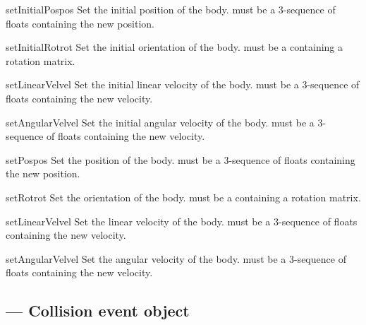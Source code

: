 \begin{methoddesc}{setInitialPos}{pos}
Set the initial position of the body.  must be a 3-sequence of 
floats containing the new position.
\end{methoddesc}

\begin{methoddesc}{setInitialRot}{rot}
Set the initial orientation of the body.  must be a
 containing a rotation matrix.
\end{methoddesc}

\begin{methoddesc}{setLinearVel}{vel}
Set the initial linear velocity of the body.  must be a
3-sequence of floats containing the new velocity.
\end{methoddesc}

\begin{methoddesc}{setAngularVel}{vel}
Set the initial angular velocity of the body.  must be a
3-sequence of floats containing the new velocity.
\end{methoddesc}

\begin{methoddesc}{setPos}{pos}
Set the position of the body.  must be a 3-sequence of floats
containing the new position.
\end{methoddesc}

\begin{methoddesc}{setRot}{rot}
Set the orientation of the body.  must be a  containing a
rotation matrix.
\end{methoddesc}

\begin{methoddesc}{setLinearVel}{vel}
Set the linear velocity of the body.  must be a 3-sequence of floats
containing the new velocity.
\end{methoddesc}

\begin{methoddesc}{setAngularVel}{vel}
Set the angular velocity of the body.  must be a 3-sequence of floats
containing the new velocity.
\end{methoddesc}

\subsection{ ---
         Collision event object}
\label{odecollisionevent}

